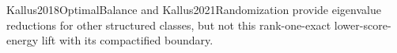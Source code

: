 Kallus2018OptimalBalance and Kallus2021Randomization provide eigenvalue reductions for other structured classes, but not this rank-one-exact lower-score-energy lift with its compactified boundary.